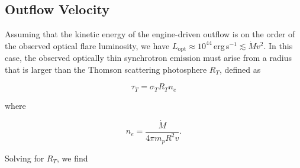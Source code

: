 \documentclass{nature_plusfigure}
\begin{document}
\begin{methods}



\section{Outflow Velocity}
\label{sec:outflow-velocity}

Assuming that the kinetic energy of the engine-driven outflow is on the order of the observed optical flare luminosity, we have $L_\mathrm{opt} \approx 10^{44}\,$erg\,s$^{-1} \lesssim \dot{M}v^2$. In this case, the observed optically thin synchrotron emission must arise from a radius that is larger than the Thomson scattering photosphere $R_T$, defined as

\begin{equation}
    \tau_T = \sigma_T R_T n_e
\end{equation}

\noindent where 

\begin{equation}
    n_e = \frac{\dot{M}}{4\pi m_p R^2 v}.
\end{equation}

\noindent Solving for $R_T$, we find


\end{methods}
\end{document}
